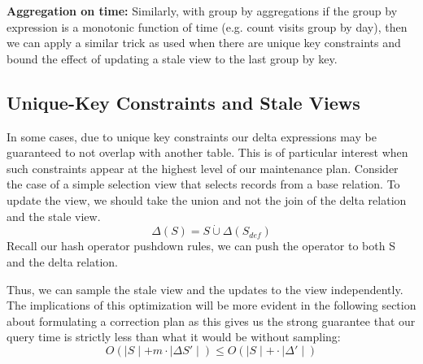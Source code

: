 \textbf{Aggregation on time: } Similarly, with group by aggregations if the group by expression is a monotonic function of time (e.g. count visits group by day), then we can apply a similar trick as used when there are unique key constraints and bound the effect of updating a stale view to the last group by key.

\subsection{Unique-Key Constraints and Stale Views}
In some cases, due to unique key constraints our delta expressions may be guaranteed to not overlap with another table. 
This is of particular interest when such constraints appear at the highest level of our maintenance plan.
Consider the case of a simple selection view that selects records from a base relation. 
To update the view, we should take the union and not the join of the delta relation and the stale view. 
\[ \Delta(S) = S \dot{\cup} \Delta(S_{def}) \]
Recall our hash operator pushdown rules, we can push the operator to both S and the delta relation.

Thus, we can sample the stale view and the updates to the view independently.
The implications of this optimization will be more evident in the following section about formulating a correction plan as this gives us the strong guarantee that our query time is strictly less than what it would be without sampling:
\[O(\mid S \mid + m \cdot \mid \Delta S' \mid) \le O(\mid S \mid + \cdot \mid \Delta ' \mid)\]




